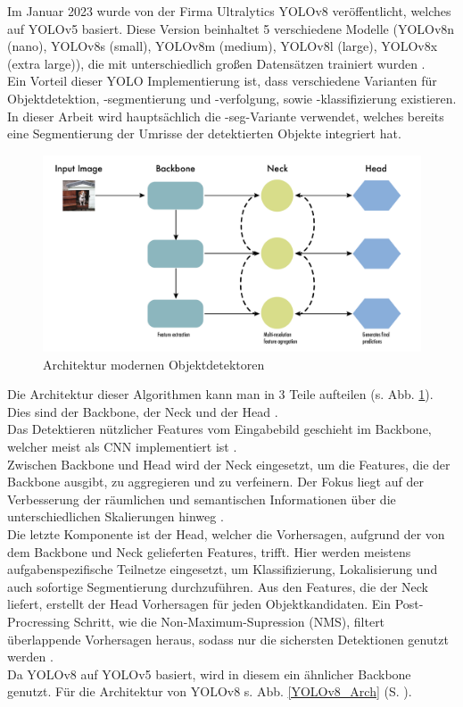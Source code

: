 {{	Im Januar 2023 wurde von der Firma Ultralytics YOLOv8 veröffentlicht, welches auf YOLOv5 basiert. Diese Version beinhaltet 5 verschiedene Modelle (YOLOv8n (nano), YOLOv8s (small), YOLOv8m (medium), YOLOv8l (large), YOLOv8x (extra large)), die mit unterschiedlich großen Datensätzen trainiert wurden  \citep{Terven2023}. \\	
	Ein Vorteil dieser YOLO Implementierung ist, dass verschiedene Varianten für Objektdetektion, -segmentierung und -verfolgung, sowie -klassifizierung existieren. In dieser Arbeit wird hauptsächlich die \glqq -seg\grqq{}-Variante verwendet, welches bereits eine Segmentierung der Umrisse der detektierten Objekte integriert hat.
	\begin{figure}[h]
		\centering
		\includegraphics*[scale = 0.20, keepaspectratio]{images/YOLO/YOLOv8_object_detector_general.png}
		\caption[Architektur modernen Objektdetektoren]{Architektur modernen Objektdetektoren \citep{Terven2023}}
		\label{YOLO_obj_det_gen}
	\end{figure}
	Die Architektur dieser Algorithmen kann man in 3 Teile aufteilen (s. Abb. \ref{YOLO_obj_det_gen}). Dies sind der Backbone, der Neck und der Head \citep{Terven2023}. \\
	Das Detektieren nützlicher Features vom Eingabebild geschieht im Backbone, welcher meist als CNN implementiert ist \citep{Terven2023}. \\
	Zwischen Backbone und Head wird der Neck eingesetzt, um die Features, die der Backbone ausgibt, zu aggregieren und zu verfeinern. Der Fokus liegt auf der Verbesserung der räumlichen und semantischen Informationen über die unterschiedlichen Skalierungen hinweg \citep{Terven2023}. \\
	Die letzte Komponente ist der Head, welcher die Vorhersagen, aufgrund der von dem Backbone und Neck gelieferten Features, trifft. Hier werden meistens aufgabenspezifische Teilnetze eingesetzt, um Klassifizierung, Lokalisierung und auch sofortige Segmentierung durchzuführen. Aus den Features, die der Neck liefert, erstellt der Head Vorhersagen für jeden Objektkandidaten. Ein Post-Procressing Schritt, wie die Non-Maximum-Supression (NMS), filtert überlappende Vorhersagen heraus, sodass nur die sichersten Detektionen genutzt werden \citep{Terven2023}.\\
	Da YOLOv8 auf YOLOv5 basiert, wird in diesem ein ähnlicher Backbone genutzt. Für die Architektur von YOLOv8 s. Abb. \ref{YOLOv8_Arch} (S. \pageref{YOLOv8_Arch}). 

}}
